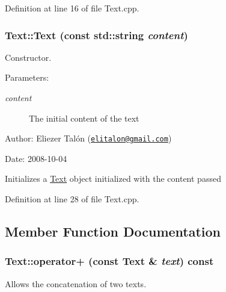 Definition at line 16 of file Text.cpp.\hypertarget{class_text_c3c20ee8baeb7b88e2622724f57e50a2}{
\subsubsection[Text]{\setlength{\rightskip}{0pt plus 5cm}Text::Text (const std::string {\em content})}}
\label{class_text_c3c20ee8baeb7b88e2622724f57e50a2}


Constructor. 

\begin{Desc}
\item[Parameters:]
\begin{description}
\item[{\em content}]The initial content of the text\end{description}
\end{Desc}
\begin{Desc}
\item[Author:]Eliezer Talón (\href{mailto:elitalon@gmail.com}{\tt elitalon@gmail.com}) \end{Desc}
\begin{Desc}
\item[Date:]2008-10-04\end{Desc}
Initializes a \hyperlink{class_text}{Text} object initialized with the content passed 

Definition at line 28 of file Text.cpp.

\subsection{Member Function Documentation}
\hypertarget{class_text_c8887fb224e0402448ede4f3b9f7452d}{
\subsubsection[operator+]{ Text::operator+ (const {\bf Text} \& {\em text}) const}}
\label{class_text_c8887fb224e0402448ede4f3b9f7452d}


Allows the concatenation of two texts. 

